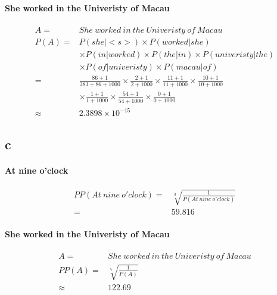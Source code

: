 \documentclass{article}
\begin{document}
    \paragraph{She worked in the Univeristy of Macau}
    \begin{equation}
        \begin{split}
            A=&She\ worked\  in\  the\  Univeristy\  of\  Macau\\
            P(A)=&P(she|<s>)\times P(worked|she)\\
                &\times P(in|worked)\times P(the|in)\times P(univeristy|the)\\
                &\times P(of|univeristy)\times P(macau|of)\\
                =&\frac{86+1}{383+86+1000}\times\frac{2+1}{2+1000}\times\frac{11+1}{11+1000}\times\frac{10+1}{10+1000}\\&\times\frac{1+1}{1+1000}\times\frac{54+1}{54+1000}\times\frac{0+1}{0+1000}\\
                \approx&2.3898\times 10^{-15}
        \end{split}
    \end{equation}

    \subsection*{c}
    \paragraph{At nine o'clock}
    \begin{equation}
        \begin{split}
            PP(At\  nine\  o'clock)=&\sqrt[3]{\frac{1}{P(At\  nine\  o'clock)}}\\
                                    =&59.816
        \end{split}
    \end{equation}
    \paragraph{She worked in the Univeristy of Macau}
    \begin{equation}
        \begin{split}
            A=&She\ worked\  in\  the\  Univeristy\  of\  Macau\\
            PP(A)=&\sqrt[7]{\frac{1}{P(A)}}\\
            \approx&122.69
        \end{split}
    \end{equation}
\end{document}
